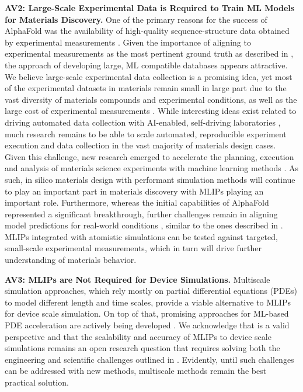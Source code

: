 \textbf{AV2: Large-Scale Experimental Data is Required to Train ML Models for Materials Discovery.} One of the primary reasons for the success of AlphaFold \citep{jumper2021highly} was the availability of high-quality sequence-structure data obtained by experimental measurements \citep{wwpdb2019protein}. Given the importance of aligning to experimental measurements as the most pertinent ground truth as described in , the approach of developing large, ML compatible databases appears attractive. We believe large-scale experimental data collection is a promising idea, yet most of the experimental datasets in materials remain small in large part due to the vast diversity of materials compounds and experimental conditions, as well as the large cost of experimental measurements \citep{xu2023small}. While interesting ideas exist related to driving automated data collection with AI-enabled, self-driving laboratories \citep{miret2024llms, sim2024chemos}, much research remains to be able to scale automated, reproducible experiment execution and data collection in the vast majority of materials design cases. Given this challenge, new research emerged to accelerate the planning, execution and analysis of materials science experiments with machine learning methods \citep{miret2024perspective}. As such, in silico materials design with performant simulation methods will continue to play an important part in materials discovery with MLIPs playing an important role. Furthermore, whereas the initial capabilities of AlphaFold represented a significant breakthrough, further challenges remain in aligning model predictions for real-world conditions \citep{terwilliger2024alphafold}, similar to the ones described in . MLIPs integrated with atomistic simulations can be tested against targeted, small-scale experimental measurements, which in turn will drive further understanding of materials behavior.



\textbf{AV3: MLIPs are Not Required for Device Simulations. } Multiscale simulation approaches, which rely mostly on partial differential equations (PDEs) to model different length and time scales, provide a viable alternative to MLIPs for device scale simulation. On top of that, promising approaches for ML-based PDE acceleration are actively being developed \citep{kovachki2023neural, brunton2024promising, brandstetter2022message, takamoto2022pdebench}. We acknowledge that is a valid perspective and that the scalability and accuracy of MLIPs to device scale simulations remains an open research question that requires solving both the engineering and scientific challenges outlined in . Evidently, until such challenges can be addressed with new methods, multiscale methods remain the best practical solution. 

